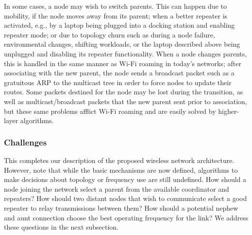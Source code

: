 In some cases, a node may wish to switch parents. This can happen due to mobility, if the node moves away from its parent; when a better repeater is activated, e.g., by a laptop being plugged into a docking station and enabling repeater mode; or due to topology churn such as during a node failure, environmental changes, shifting workloads, or the laptop described above being unplugged and disabling its repeater functionality. When a node changes parents, this is handled in the same manner as Wi-Fi roaming in today's networks; after associating with the new parent, the node sends a broadcast packet such as a gratuitous ARP to the multicast tree in order to force nodes to update their routes. Some packets destined for the node may be lost during the transition, as well as multicast/broadcast packets that the new parent sent prior to association, but these same problems afflict Wi-Fi roaming and are easily solved by higher-layer algorithms.





\subsubsection{Challenges}
This completes our description of the proposed wireless network architecture. However, note that while the basic mechanisms are now defined, algorithms to make decisions about topology or frequency use are still undefined. How should a node joining the network select a parent from the available coordinator and repeaters? How should two distant nodes that wish to communicate select a good repeater to relay transmissions between them? How should a potential nephew and aunt connection choose the best operating frequency for the link? We address these questions in the next subsection.

